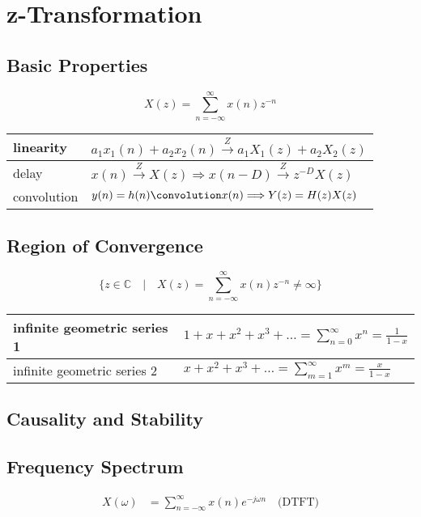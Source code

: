 \section{z-Transformation}

\subsection{Basic Properties}

\[
	X(z) = \sum\limits_{n=-\infty}^\infty x(n)z^{-n}
\]

\begin{tabular}{|l|l|}
	\hline
	linearity & $a_1x_1(n) + a_2x_2(n) \overset{Z}{\longrightarrow} a_1X_1(z) + a_2X_2(z)$
	\\ \hline
	delay	& $x(n) \overset{Z}{\longrightarrow} X(z) \Longrightarrow x(n-D) \overset{Z}{\longrightarrow} z^{-D}X(z)$
	\\ \hline
	convolution & $y(n) = h(n) \convolution x(n) \Longrightarrow Y(z) = H(z)X(z)$
	\\ \hline
\end{tabular}


\subsection{Region of Convergence}

\[
	\{ z \in \mathbb{C} \quad | \quad X(z) = \sum\limits_{n=-\infty}^{\infty} x(n)z^{-n} \neq \infty \}
\]

\begin{tabular}{|l|l|}
	\hline
	infinite geometric series 1 & $1 + x + x^2 + x^3 + \ldots = \sum\limits_{n=0}^{\infty} x^n = \frac{1}{1-x}$
	\\ \hline
	infinite geometric series 2 & $x + x^2 + x^3 + \ldots = \sum\limits_{m=1}^{\infty} x^m = \frac{x}{1-x}$
	\\ \hline
\end{tabular}


\subsection{Causality and Stability}


\subsection{Frequency Spectrum}
\begin{align*}
	X(\omega)&= \sum\limits_{n=-\infty}^{\infty} x(n)e^{-j\omega n} \quad \text{(DTFT)}
\end{align*}
